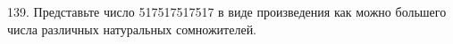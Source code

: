 139. Представьте число 517517517517 в виде произведения как можно большего числа различных натуральных сомножителей.\\
